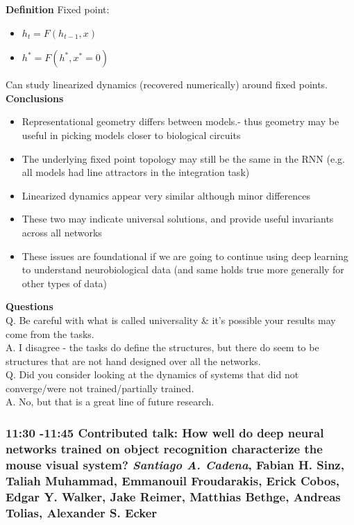 \documentclass[12pt]{article}
\begin{document}
\textbf{Definition} Fixed point: 
\begin{itemize}
    \item $h_t = F(h_{t-1},x)$
    \item $h^* = F(h^*, x^* = 0)$
\end{itemize}

Can study linearized dynamics (recovered numerically) around fixed points. \\

\textbf{Conclusions}
\begin{itemize}
\item Representational geometry differs between models.- thus geometry may be useful in picking models closer to biological circuits
\item The underlying fixed point topology may still be the same in the RNN (e.g. all models had line attractors in the integration task)
\item Linearized dynamics appear very similar although minor differences
\item These two may indicate universal solutions, and provide useful invariants across all networks
\item These issues are foundational if we are going to continue using deep learning to understand neurobiological data (and same holds true more generally for other types of data)
\end{itemize}

\textbf{Questions} \\

Q. Be careful with what is called universality  \& it's possible your results may come from the tasks. \\

A. I disagree - the tasks do define the structures, but there do seem to be structures that are not hand designed over all the networks. \\

Q. Did you consider looking at the dynamics of systems that did not converge/were not trained/partially trained. \\

A. No, but that is a great line of future research. 


\subsubsection{11:30 -11:45 Contributed talk: How well do deep neural networks trained on object recognition characterize the mouse visual system? \textit{Santiago A. Cadena}, Fabian H. Sinz, Taliah Muhammad, Emmanouil Froudarakis, Erick Cobos, Edgar Y. Walker, Jake Reimer, Matthias Bethge, Andreas Tolias, Alexander S. Ecker}
\end{document}
